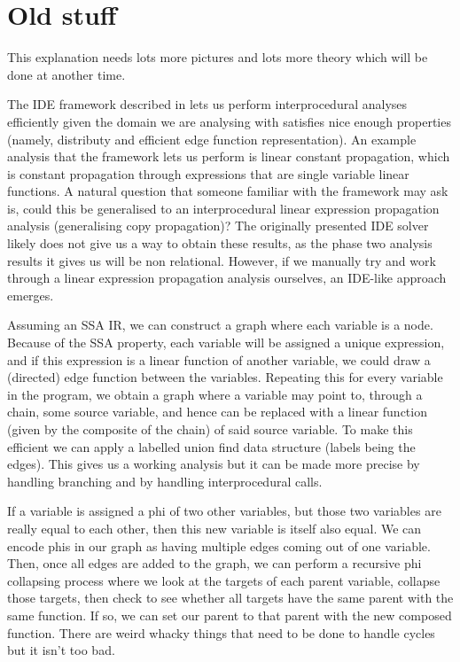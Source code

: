 \documentclass{article}
\begin{document}
\section{Old stuff}

This explanation needs lots more pictures and lots more theory which will be done at another time.

The IDE framework described in \cite{sagiv_precise_1996} lets us perform interprocedural analyses efficiently given the domain we are analysing with satisfies nice enough properties (namely, distributy and efficient edge function representation).
An example analysis that the framework lets us perform is linear constant propagation, which is constant propagation through expressions that are single variable linear functions.
A natural question that someone familiar with the framework may ask is, could this be generalised to an interprocedural linear expression propagation analysis (generalising copy propagation)?
The originally presented IDE solver likely does not give us a way to obtain these results, as the phase two analysis results it gives us will be non relational.
However, if we manually try and work through a linear expression propagation analysis ourselves, an IDE-like approach emerges.

Assuming an SSA IR, we can construct a graph where each variable is a node.
Because of the SSA property, each variable will be assigned a unique expression, and if this expression is a linear function of another variable, we could draw a (directed) edge function between the variables.
Repeating this for every variable in the program, we obtain a graph where a variable may point to, through a chain, some source variable, and hence can be replaced with a linear function (given by the composite of the chain) of said source variable.
To make this efficient we can apply a labelled union find data structure (labels being the edges).
This gives us a working analysis but it can be made more precise by handling branching and by handling interprocedural calls.

If a variable is assigned a phi of two other variables, but those two variables are really equal to each other, then this new variable is itself also equal.
We can encode phis in our graph as having multiple edges coming out of one variable.
Then, once all edges are added to the graph, we can perform a recursive phi collapsing process where we look at the targets of each parent variable, collapse those targets, then check to see whether all targets have the same parent with the same function.
If so, we can set our parent to that parent with the new composed function.
There are weird whacky things that need to be done to handle cycles but it isn't too bad.
\end{document}
